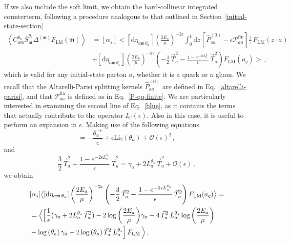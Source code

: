 \documentclass[a4paper, 12pt]{book}
\newcommand{\um}{\mathfrak{m}}
\begin{document}
If we also include the soft limit, we obtain the hard-collinear integrated counterterm, following a procedure analogous to that outlined in Section~\ref{initial-state-section}
\begin{equation}
  \begin{aligned}
    \left< C_{a\um}^{\theta_a} \bar{S}_\um^{\theta_s} \Delta^{(\um)} F_{\mathrm{LM}} (\um) \right>  &= [\alpha_s] \bigl< [\mathrm{d}\eta_{a\um \, \theta_a}] \left(\frac{2E_a}{\mu}\right)^{-2\epsilon} \int_{0}^{1} \mathrm{d}z \, \left[\hat{P}_{aa}^{(0)}-\epsilon \mathcal{P}_{aa}^{\mathrm{fin}}\right] \frac{1}{z} \, F_{\mathrm{LM}}(z\cdot a) \\
    & + [\mathrm{d}\eta_{a\um \, \theta_a}] \left(\frac{2E_a}{\mu}\right)^{-2\epsilon} \left(-\frac{3}{2} \, \vec{T}_a^2-\frac{1-e^{-2\epsilon L_a^{\theta_s}}}{\epsilon}\, \vec{T}_a^2 \right) F_{\mathrm{LM}}(a_q) \bigr> \, ,
    \label{blue}
  \end{aligned}
\end{equation}
which is valid for any initial-state parton $a$, whether it is a quark or a gluon. We recall that the Altarelli-Parisi splitting kernels $\hat{P}_{aa}^{(0)}$ are defined in Eq.~\ref{altarelli-parisi}, and that $\mathcal{P}_{aa}^{\mathrm{fin}}$ is defined as in Eq.~\ref{P-qq-finite}. We are particularly interested in examining the second line of Eq.~\ref{blue}, as it contains the terms that actually contribute to the operator $I_{\mathrm{C}}(\epsilon)$. Also in this case, it is useful to perform an expansion in $\epsilon$. Making use of the following equations
\begin{equation}
  [\mathrm{d}\eta_{a\um \, \theta_a}] = -\frac{\theta_a^{-\epsilon}}{\epsilon} + \epsilon \mathrm{Li}_2 (\theta_a)+ \mathcal{O}(\epsilon)^2 \, ,
  \label{de-eta}
\end{equation}
and
\begin{equation}
  \frac{3}{2}\, \vec{T}_a^2+ \frac{1-e^{-2\epsilon L_a^{\theta_s}}}{\epsilon} \, \vec{T}_a^2  = \gamma_a + 2 L_a^{\theta_s} \,\vec{T}_a^2 + \mathcal{O} (\epsilon) \, ,
\end{equation}
we obtain
\begin{equation}
  \begin{aligned}
    & [\alpha_s]\bigl < [\mathrm{d}\eta_{a\um \, \theta_a}] \left(\frac{2E_a}{\mu}\right)^{-2\epsilon} \left(-\frac{3}{2} \, \vec{T}_a^2-\frac{1-e^{-2\epsilon L_a^{\theta_s}}}{\epsilon}\, \vec{T}_a^2 \right) F_{\mathrm{LM}}(a_q) \bigr> = \\
    & = \Bigl< \Bigl[ \frac{1}{\epsilon}(\gamma_a +  2 L_a^{\theta_s} \,\vec{T}_a^2) - 2 \log{\left(\frac{2E_a}{\mu}\right)}\gamma_a - 4 \, \vec{T}_a^2 \, L_a^{\theta_s} \log{\left(\frac{2E_a}{\mu}\right)} \\
    & - \log{(\theta_a)} \, \gamma_a - 2 \log{(\theta_a)} \, \vec{T}_a^2 \, L_a^{\theta_s}  \Bigr] \, F_{\mathrm{LM}} \, \Bigr > \, ,
  \end{aligned}
\end{equation}
\end{document}

